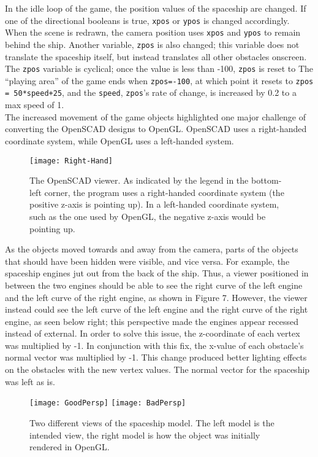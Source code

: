 \documentclass[12pt]{article}
\begin{document}
\begin{doublespace}
In the idle loop of the game, the position values of the spaceship are changed. If one of the directional booleans is true, \texttt{xpos} or \texttt{ypos} is changed accordingly. When the scene is redrawn, the camera position uses \texttt{xpos} and \texttt{ypos} to remain behind the ship. Another variable, \texttt{zpos} is also changed; this variable does not translate the spaceship itself, but instead translates all other obstacles onscreen. The \texttt{zpos} variable is cyclical; once the value is less than -100, \texttt{zpos} is reset to The ``playing area'' of the game ends when \texttt{zpos=-100}, at which point it resets to \texttt{zpos = 50*speed+25}, and the \texttt{speed}, \texttt{zpos}'s rate of change, is increased by 0.2 to a max speed of 1.\\

The increased movement of the game objects highlighted one major challenge of converting the OpenSCAD designs to OpenGL. OpenSCAD uses a right-handed coordinate system, while OpenGL uses a left-handed system.
\begin{figure}[h]
  \texttt{[image: Right-Hand]}
  \centering
  \caption{The OpenSCAD viewer. As indicated by the legend in the bottom-left corner, the program uses a right-handed coordinate system (the positive z-axis is pointing up). In a left-handed coordinate system, such as the one used by OpenGL, the negative z-axis would be pointing up.}
\end{figure}
As the objects moved towards and away from the camera, parts of the objects that should have been hidden were visible, and vice versa. For example, the spaceship engines jut out from the back of the ship. Thus, a viewer positioned in between the two engines should be able to see the right curve of the left engine and the left curve of the right engine, as shown in Figure 7. However, the viewer instead could see the left curve of the left engine and the right curve of the right engine, as seen below right; this perspective made the engines appear recessed instead of external. In order to solve this issue, the z-coordinate of each vertex was multiplied by -1. In conjunction with this fix, the x-value of each obstacle's normal vector was multiplied by -1. This change produced better lighting effects on the obstacles with the new vertex values. The normal vector for the spaceship was left as is.
\begin{figure}[h]
  \texttt{[image: GoodPersp]}
  \texttt{[image: BadPersp]}
  \centering
  \caption{Two different views of the spaceship model. The left model is the intended view, the right model is how the object was initially rendered in OpenGL.}
\end{figure}


\end{doublespace}
\end{document}
